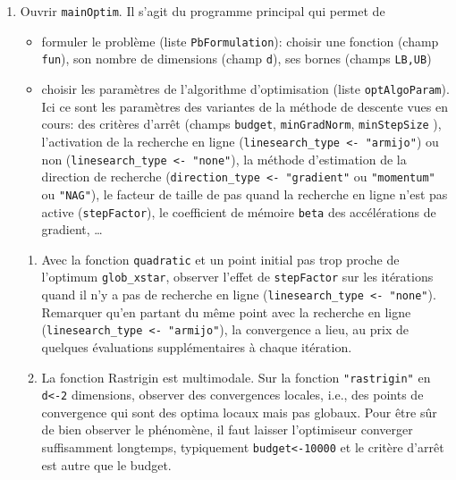 \documentclass[12pt]{article}
\begin{document}
\begin{enumerate}
\item Ouvrir \texttt{mainOptim}. Il s'agit du programme principal qui permet de 
\begin{itemize}
\item formuler le problème (liste \texttt{PbFormulation}): choisir une fonction (champ \texttt{fun}), son nombre de dimensions (champ \texttt{d}), ses bornes (champs \texttt{LB,UB})
\item choisir les paramètres de l'algorithme d'optimisation (liste \texttt{optAlgoParam}).
Ici ce sont les paramètres des variantes de la méthode de descente vues en cours: des critères d'arrêt (champs \texttt{budget}, \texttt{minGradNorm}, \texttt{minStepSize} ), l'activation de la recherche en ligne (\texttt{linesearch\_type <- "armijo"}) ou non (\texttt{linesearch\_type <- "none"}), la méthode d'estimation de la direction de recherche (\texttt{direction\_type <- "gradient"} ou \texttt{"momentum"} ou \texttt{"NAG"}), le facteur de taille de pas quand la recherche en ligne n'est pas active (\texttt{stepFactor}), le coefficient de mémoire \texttt{beta} des accélérations de gradient, \ldots
\end{itemize}
\begin{enumerate}
\item Avec la fonction \texttt{quadratic} et un point initial pas trop proche de l'optimum \texttt{glob\_xstar}, observer l'effet de \texttt{stepFactor} sur les itérations quand il n'y a pas de recherche en ligne (\texttt{linesearch\_type <- "none"}). Remarquer qu'en partant du même point avec la recherche en ligne (\texttt{linesearch\_type <- "armijo"}), la convergence a lieu, au prix de quelques évaluations supplémentaires à chaque itération.
\item  La fonction Rastrigin est multimodale. Sur la fonction \texttt{"rastrigin"} en \texttt{d<-2} dimensions, observer des convergences locales, i.e., des points de convergence qui sont des optima locaux mais pas globaux. Pour être sûr de bien observer le phénomène, il faut laisser l'optimiseur converger suffisamment longtemps, typiquement \texttt{budget<-10000} et le critère d'arrêt est autre que le budget.
\end{enumerate}

\end{enumerate}
\end{document}

